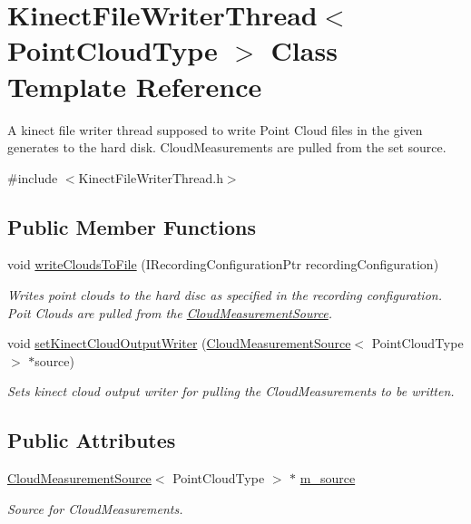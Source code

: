 \hypertarget{class_kinect_file_writer_thread}{}\section{Kinect\+File\+Writer\+Thread$<$ Point\+Cloud\+Type $>$ Class Template Reference}
\label{class_kinect_file_writer_thread}


A kinect file writer thread supposed to write Point Cloud files in the given generates to the hard disk. Cloud\+Measurements are pulled from the set source.  




{\ttfamily \#include $<$Kinect\+File\+Writer\+Thread.\+h$>$}

\subsection*{Public Member Functions}
\begin{DoxyCompactItemize}
\item 
void \hyperlink{class_kinect_file_writer_thread_a01f9ee028eaa9d7c589450b559073de8}{write\+Clouds\+To\+File} (I\+Recording\+Configuration\+Ptr recording\+Configuration)
\begin{DoxyCompactList}\small\item\em Writes point clouds to the hard disc as specified in the recording configuration. Poit Clouds are pulled from the \hyperlink{class_cloud_measurement_source}{Cloud\+Measurement\+Source}. \end{DoxyCompactList}\item 
void \hyperlink{class_kinect_file_writer_thread_a637b890fa3e51e7aacfcf7e673e0203b}{set\+Kinect\+Cloud\+Output\+Writer} (\hyperlink{class_cloud_measurement_source}{Cloud\+Measurement\+Source}$<$ Point\+Cloud\+Type $>$ $\ast$source)
\begin{DoxyCompactList}\small\item\em Sets kinect cloud output writer for pulling the Cloud\+Measurements to be written. \end{DoxyCompactList}\end{DoxyCompactItemize}
\subsection*{Public Attributes}
\begin{DoxyCompactItemize}
\item 
\hypertarget{class_kinect_file_writer_thread_ad8c1969775c3b52166630f7258eba0bc}{}\hyperlink{class_cloud_measurement_source}{Cloud\+Measurement\+Source}$<$ Point\+Cloud\+Type $>$ $\ast$ \hyperlink{class_kinect_file_writer_thread_ad8c1969775c3b52166630f7258eba0bc}{m\+\_\+source}\label{class_kinect_file_writer_thread_ad8c1969775c3b52166630f7258eba0bc}

\begin{DoxyCompactList}\small\item\em Source for Cloud\+Measurements. \end{DoxyCompactList}\end{DoxyCompactItemize}


